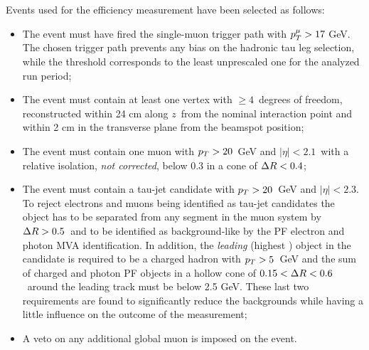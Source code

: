 Events used for the efficiency measurement have been selected as follows:
\begin{itemize}
\item The event must have fired the single-muon trigger path with $p_{T}^\mu > 17$ GeV. The chosen trigger path prevents any bias on the hadronic tau leg selection, while the \pT threshold corresponds to the least unprescaled one for the analyzed run period;
\item The event must contain at least one vertex with $\geq 4$\ degrees of freedom, reconstructed within 24 cm along $z$\ from the nominal interaction point and within 2 cm in the transverse plane from the beamspot position;
\item The event must contain one muon with $p_{T} > 20$\ GeV and $|\eta| < 2.1$\ with a relative isolation, \emph{not \db corrected}, below 0.3 in a cone of $\Delta R < 0.4$;
\item The event must contain a tau-jet candidate with $p_{T} > 20$\ GeV and $|\eta| < 2.3$. To reject electrons and muons being identified as tau-jet candidates the object has to be separated from any segment in the muon system by $\Delta R > 0.5$\ and to be identified as background-like by the PF electron and photon MVA identification. In addition, the \emph{leading} (highest \pT) object in the candidate is required to be a charged hadron with $p_{T} > 5$\ GeV and the \pT sum of charged and photon PF objects in a hollow cone of $0.15 < \Delta R < 0.6$\ around the leading track must be below 2.5 GeV. These last two requirements are found to significantly reduce the backgrounds while having a little influence on the outcome of the measurement; 
\item A veto on any additional global muon is imposed on the event.
\end{itemize}

